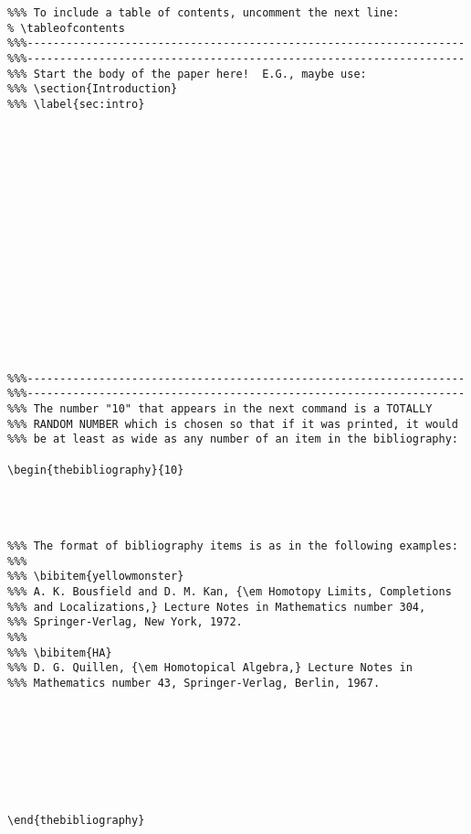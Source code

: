 \begin{verbatim}
%%% To include a table of contents, uncomment the next line:
% \tableofcontents
%%%-------------------------------------------------------------------
%%%-------------------------------------------------------------------
%%% Start the body of the paper here!  E.G., maybe use:
%%% \section{Introduction}
%%% \label{sec:intro}

















%%%-------------------------------------------------------------------
%%%-------------------------------------------------------------------
%%% The number "10" that appears in the next command is a TOTALLY
%%% RANDOM NUMBER which is chosen so that if it was printed, it would
%%% be at least as wide as any number of an item in the bibliography:

\begin{thebibliography}{10}




%%% The format of bibliography items is as in the following examples:
%%%
%%% \bibitem{yellowmonster}
%%% A. K. Bousfield and D. M. Kan, {\em Homotopy Limits, Completions
%%% and Localizations,} Lecture Notes in Mathematics number 304,
%%% Springer-Verlag, New York, 1972.
%%%
%%% \bibitem{HA}
%%% D. G. Quillen, {\em Homotopical Algebra,} Lecture Notes in
%%% Mathematics number 43, Springer-Verlag, Berlin, 1967.








\end{thebibliography}

\end{verbatim}












